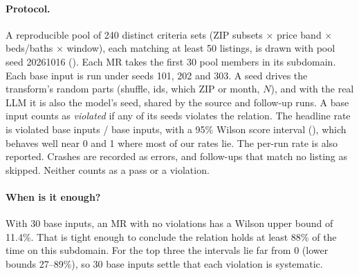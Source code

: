 \documentclass[11pt,a4paper]{article}
\newcommand{\file}[1]{\texttt{\detokenize{#1}}}
\begin{document}
\paragraph{Protocol.} A reproducible pool of 240 distinct criteria sets (ZIP subsets $\times$ price band $\times$
beds/baths $\times$ window), each matching at least 50 listings, is drawn with pool seed 20261016
(\file{mr/inputs.py}). Each MR takes the first 30 pool members in its subdomain. Each base input is run under seeds
101, 202 and 303. A seed drives the transform's random parts (shuffle, ids, which ZIP or month, $N$), and with the
real LLM it is also the model's seed, shared by the source and follow-up runs. A base input counts as
\emph{violated} if any of its seeds violates the relation. The headline rate is violated base inputs / base inputs,
with a 95\% Wilson score interval (\file{mr/stats.py}), which behaves well near 0 and 1 where most of our rates lie. The
per-run rate is also reported. Crashes are recorded as errors, and follow-ups that match no listing as skipped. Neither
counts as a pass or a violation.

\paragraph{When is it enough?} With 30 base inputs, an MR with no violations has a Wilson upper bound of 11.4\%. That is
tight enough to conclude the relation holds at least 88\% of the time on this subdomain. For the top three the intervals
lie far from 0 (lower bounds 27--89\%), so 30 base inputs settle that each violation is systematic.
\end{document}
